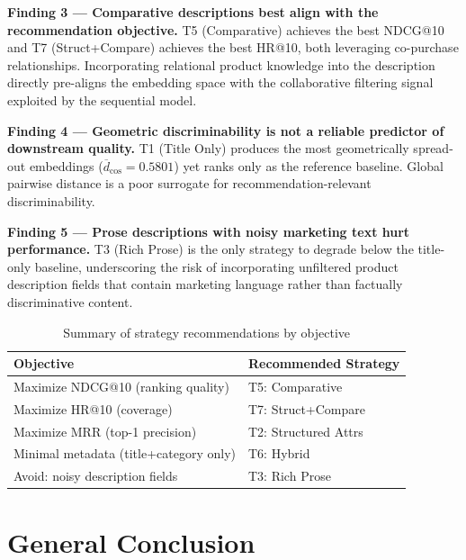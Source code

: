\documentclass[12pt,a4paper]{report}
\begin{document}
\medskip
\noindent\textbf{Finding 3 --- Comparative descriptions best
align with the recommendation objective.}
T5 (Comparative) achieves the best NDCG@10 and T7
(Struct+Compare) achieves the best HR@10, both leveraging
co-purchase relationships. Incorporating relational
product knowledge into the description directly pre-aligns
the embedding space with the collaborative filtering
signal exploited by the sequential model.

\medskip
\noindent\textbf{Finding 4 --- Geometric discriminability
is not a reliable predictor of downstream quality.}
T1 (Title Only) produces the most geometrically spread-out
embeddings ($\overline{d}_{\cos} = 0.5801$) yet ranks only
as the reference baseline. Global pairwise distance is a
poor surrogate for recommendation-relevant discriminability.

\medskip
\noindent\textbf{Finding 5 --- Prose descriptions with noisy
marketing text hurt performance.}
T3 (Rich Prose) is the only strategy to degrade below the
title-only baseline, underscoring the risk of incorporating
unfiltered product description fields that contain
marketing language rather than factually discriminative content.

\begin{table}[ht]
\centering
\caption{Summary of strategy recommendations by objective}
\label{tab:strategy_recommendations}
\renewcommand{\arraystretch}{1.3}
\small
\begin{tabular}{@{} l l @{}}
\toprule
\textbf{Objective} & \textbf{Recommended Strategy} \\
\midrule
Maximize NDCG@10 (ranking quality)  & T5: Comparative \\
Maximize HR@10 (coverage)            & T7: Struct+Compare \\
Maximize MRR (top-1 precision)       & T2: Structured Attrs \\
Minimal metadata (title+category only) & T6: Hybrid \\
Avoid: noisy description fields      & T3: Rich Prose \\
\bottomrule
\end{tabular}
\end{table}

\chapter*{General Conclusion}
\end{document}
